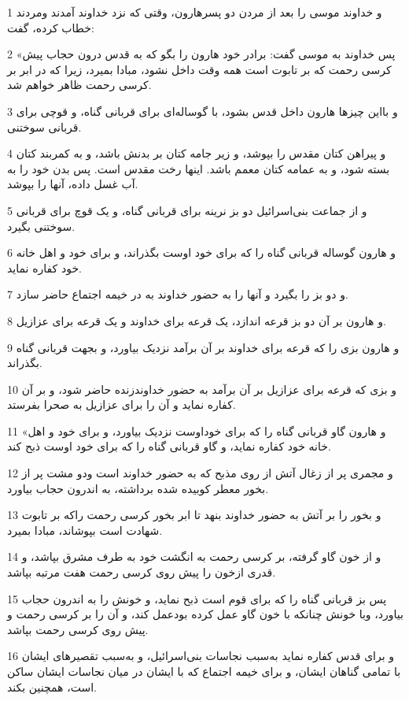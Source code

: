 \par 1 و خداوند موسی را بعد از مردن دو پسرهارون، وقتی که نزد خداوند آمدند ومردند خطاب کرده، گفت:
\par 2 «پس خداوند به موسی گفت: برادر خود هارون را بگو که به قدس درون حجاب پیش کرسی رحمت که بر تابوت است همه وقت داخل نشود، مبادا بمیرد، زیرا که در ابر بر کرسی رحمت ظاهر خواهم شد.
\par 3 و بااین چیزها هارون داخل قدس بشود، با گوساله‌ای برای قربانی گناه، و قوچی برای قربانی سوختنی.
\par 4 و پیراهن کتان مقدس را بپوشد، و زیر جامه کتان بر بدنش باشد، و به کمربند کتان بسته شود، و به عمامه کتان معمم باشد. اینها رخت مقدس است. پس بدن خود را به آب غسل داده، آنها را بپوشد.
\par 5 و از جماعت بنی‌اسرائیل دو بز نرینه برای قربانی گناه، و یک قوچ برای قربانی سوختنی بگیرد.
\par 6 و هارون گوساله قربانی گناه را که برای خود اوست بگذراند، و برای خود و اهل خانه خود کفاره نماید.
\par 7 و دو بز را بگیرد و آنها را به حضور خداوند به در خیمه اجتماع حاضر سازد.
\par 8 و هارون بر آن دو بز قرعه اندازد، یک قرعه برای خداوند و یک قرعه برای عزازیل.
\par 9 و هارون بزی را که قرعه برای خداوند بر آن برآمد نزدیک بیاورد، و بجهت قربانی گناه بگذراند.
\par 10 و بزی که قرعه برای عزازیل بر آن برآمد به حضور خداوندزنده حاضر شود، و بر آن کفاره نماید و آن را برای عزازیل به صحرا بفرستد.
\par 11 «و هارون گاو قربانی گناه را که برای خوداوست نزدیک بیاورد، و برای خود و اهل خانه خود کفاره نماید، و گاو قربانی گناه را که برای خود اوست ذبح کند.
\par 12 و مجمری پر از زغال آتش از روی مذبح که به حضور خداوند است ودو مشت پر از بخور معطر کوبیده شده برداشته، به اندرون حجاب بیاورد.
\par 13 و بخور را بر آتش به حضور خداوند بنهد تا ابر بخور کرسی رحمت راکه بر تابوت شهادت است بپوشاند، مبادا بمیرد.
\par 14 و از خون گاو گرفته، بر کرسی رحمت به انگشت خود به طرف مشرق بپاشد، و قدری ازخون را پیش روی کرسی رحمت هفت مرتبه بپاشد.
\par 15 پس بز قربانی گناه را که برای قوم است ذبح نماید، و خونش را به اندرون حجاب بیاورد، وبا خونش چنانکه با خون گاو عمل کرده بودعمل کند، و آن را بر کرسی رحمت و پیش روی کرسی رحمت بپاشد.
\par 16 و برای قدس کفاره نماید به‌سبب نجاسات بنی‌اسرائیل، و به‌سبب تقصیرهای ایشان با تمامی گناهان ایشان، و برای خیمه اجتماع که با ایشان در میان نجاسات ایشان ساکن است، همچنین بکند.
